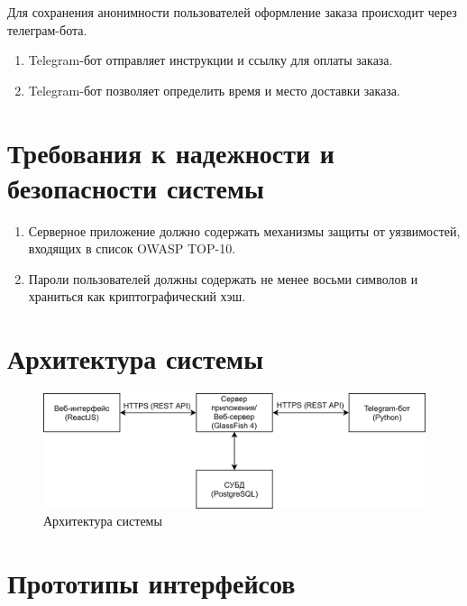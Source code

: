 \documentclass[12pt, a4paper]{article}
\begin{document}
Для сохранения анонимности пользователей оформление заказа происходит
через телеграм-бота.

\begin{enumerate}
\item Telegram-бот отправляет инструкции и ссылку для оплаты заказа.
\item Telegram-бот позволяет определить время и место доставки заказа.
\end{enumerate}

\section{Требования к надежности и безопасности системы}

\begin{enumerate}
\item Серверное приложение должно содержать механизмы защиты от
  уязвимостей, входящих в список OWASP TOP-10.
\item Пароли пользователей должны содержать не менее восьми 
  символов и храниться как криптографический хэш.
\end{enumerate}

\section{Архитектура системы}

\begin{figure}[H]
  \centering
  \includegraphics[width=16cm]{system-arch.png}
  \caption{Архитектура системы}
\end{figure}

\section{Прототипы интерфейсов}

\end{document}
